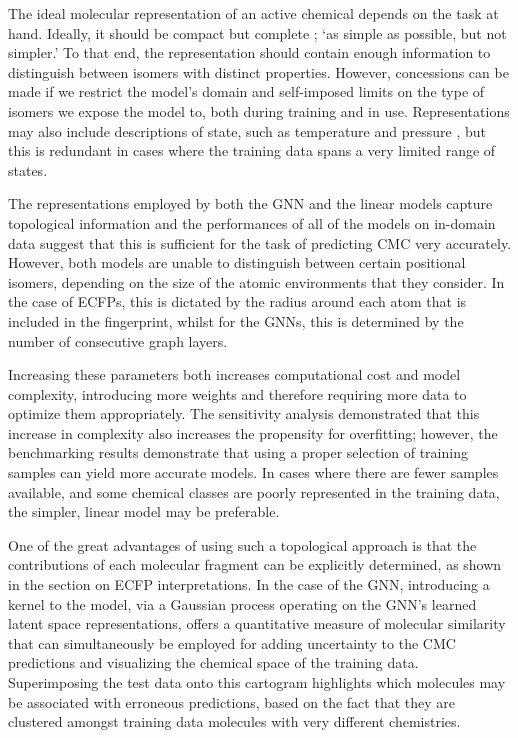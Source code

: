The ideal molecular representation of an active chemical depends on the task at
hand. Ideally, it should be compact but complete
\cite{faberCrystalStructureRepresentations2015,himanenDScribeLibraryDescriptors2020};
`as simple as possible, but not simpler.' To that end, the representation should
contain enough information to distinguish between isomers with distinct
properties. However, concessions can be made if we restrict the model's domain
and self-imposed limits on the type of isomers we expose the model to, both
during training and in use. Representations may also include descriptions of
state, such as temperature and pressure \cite{chenGraphNetworksUniversal2019},
but this is redundant in cases where the training data spans a very limited
range of states.

The representations employed by both the GNN and the linear models capture
topological information and the performances of all of the models on in-domain
data suggest that this is sufficient for the task of predicting CMC very
accurately. However, both models are unable to distinguish between certain
positional isomers, depending on the size of the atomic environments that they
consider. In the case of ECFPs, this is dictated by the radius around each atom
that is included in the fingerprint, whilst for the GNNs, this is determined by
the number of consecutive graph layers.

Increasing these parameters both increases computational cost and model
complexity, introducing more weights and therefore requiring more data to
optimize them appropriately. The sensitivity analysis demonstrated that this
increase in complexity also increases the propensity for overfitting; however,
the benchmarking results demonstrate that using a proper selection of training
samples can yield more accurate models. In cases where there are fewer samples
available, and some chemical classes are poorly represented in the training
data, the simpler, linear model may be preferable.

One of the great advantages of using such a topological approach is that the
contributions of each molecular fragment can be explicitly determined, as shown
in the section on ECFP interpretations. In the case of the GNN, introducing a
kernel to the model, via a Gaussian process operating on the GNN's learned
latent space representations, offers a quantitative measure of molecular
similarity that can simultaneously be employed for adding uncertainty to the CMC
predictions and visualizing the chemical space of the training data.
Superimposing the test data onto this cartogram highlights which molecules may
be associated with erroneous predictions, based on the fact that they are
clustered amongst training data molecules with very different chemistries.

